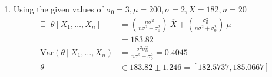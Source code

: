 \begin{enumerate}
	\item Using the given values of $ \sigma_0 = 3, \mu = 200, \sigma = 2, \overline{X} = 182, n = 20 $
	\begin{subequations}
		 \begin{align}
		 	\mathbb{E}[\theta\ |\ X_1, \dots, X_n] &= \left(\frac{n\sigma^2}{n\sigma^2 + \sigma_0^2}\right)\ \overline{X} + \left(\frac{\sigma_0^2}{n\sigma^2 + \sigma_0^2}\right)\ \mu \nonumber \\
		 	&= 183.82 \nonumber \\
		 	\mathrm{Var}(\theta\ |\ X_1, \dots, X_n) &= \frac{\sigma^2 \sigma_0^2}{n\sigma^2 + \sigma_0^2} = 0.4045 \nonumber \\
		 	\theta &\in 183.82 \pm 1.246 = [182.5737, 185.0667]
	 	 \end{align}
	\end{subequations}
	
	

\end{enumerate}